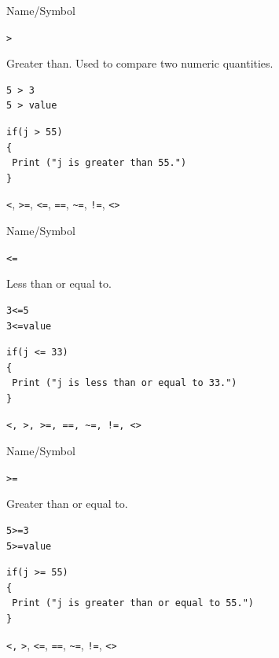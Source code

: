 \begin{desc}{Name/Symbol}

\item[Name/Symbol] 	\verb!>!                    

\item[Description] 	Greater than. Used to compare two numeric quantities.

\item[Usage]
\begin{verbatim}
5 > 3
5 > value
\end{verbatim}

\item[Example]
\begin{verbatim}
if(j > 55)
{
 Print ("j is greater than 55.")
}
\end{verbatim}

\item[See Also]     	\verb+<+, \verb+>=+, \verb+<=+, \verb+==+, \verb+~=+, \verb+!=+, \verb+<>+
\end{desc}




\begin{desc}{Name/Symbol}

\item[Name/Symbol] 	\verb+<=+                   

\item[Description] 	Less than or equal to.

\item[Usage]
\begin{verbatim}
3<=5  
3<=value
\end{verbatim}

\item[Example]
\begin{verbatim}
if(j <= 33)
{
 Print ("j is less than or equal to 33.")
}
\end{verbatim}
	
\item[See Also]     	\verb+<, >, >=, ==, ~=, !=, <>+

\end{desc}



\begin{desc}{Name/Symbol}

\item[Name/Symbol] 	\verb+>=+                   

\item[Description] 	Greater than or equal to.

\item[Usage]
\begin{verbatim}
5>=3  
5>=value
\end{verbatim}

\item[Example]
\begin{verbatim}
if(j >= 55)
{
 Print ("j is greater than or equal to 55.")
}
\end{verbatim}

\item[See Also]     	\verb+<,+ \verb+>+, \verb+<=+, \verb+==+, \verb+~=+, \verb+!=+, \verb+<>+
\end{desc}



